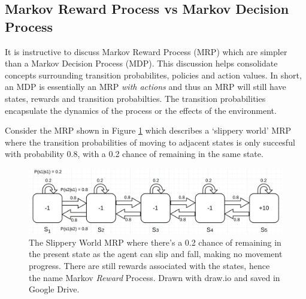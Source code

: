 \documentclass[a4paper,11pt]{article}
\begin{document}
\subsection{Markov Reward Process vs Markov Decision Process}

It is instructive to discuss Markov Reward Process (MRP) which are simpler than a Markov Decision Process (MDP).  This discussion helps consolidate concepts surrounding transition probabilites, policies and action values.  In short, an MDP is essentially an MRP {\it with actions} and thus an MRP will still have states, rewards and transition probabilties.  The transition probabilities encapsulate the dynamics of the process or the effects of the environment.  

Consider the MRP shown in Figure \ref{fig:slippery-world-mrp} which describes a `slippery world' MRP where the transition probabilities of moving to adjacent states is only succesful with probability 0.8, with a 0.2 chance of remaining in the same state.

\begin{figure}
    \includegraphics[width=\textwidth]{images/slippery_world_mrp.png}
    \caption{The Slippery World MRP where there's a 0.2 chance of remaining in the present state as the agent can slip and fall, making no movement progress.  There are still rewards associated with the states, hence the name Markov {\it Reward} Process.  Drawn with draw.io and saved in Google Drive.}
    \label{fig:slippery-world-mrp}
\end{figure}
\end{document}

